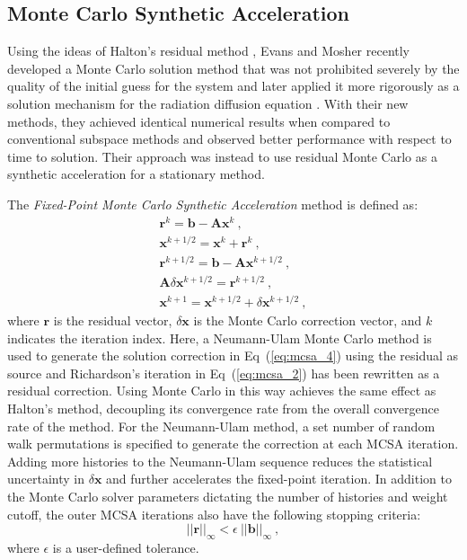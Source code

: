 \documentclass{snamc2013}
\begin{document}
\subsection{Monte Carlo Synthetic Acceleration}
Using the ideas of Halton's residual method
\cite{halton_sequential_1994}, Evans and Mosher recently developed a
Monte Carlo solution method that was not prohibited severely by the
quality of the initial guess for the system \cite{evans_monte_2009}
and later applied it more rigorously as a solution mechanism for the
radiation diffusion equation \cite{evans_monte_2012}. With their new
methods, they achieved identical numerical results when compared to
conventional subspace methods and observed better performance with
respect to time to solution. Their approach was instead to use
residual Monte Carlo as a synthetic acceleration for a stationary
method.

The \textit{Fixed-Point Monte Carlo Synthetic Acceleration} method is
defined as:
\begin{subequations}
  \begin{gather}
    \label{eq:mcsa_1}
    \mathbf{r}^{k} = \mathbf{b} - \mathbf{A}\mathbf{x}^{k}\:,\\
    \label{eq:mcsa_2}
    \mathbf{x}^{k+1/2} = \mathbf{x}^k + \mathbf{r}^k\:,\\
    \label{eq:mcsa_3}
    \mathbf{r}^{k+1/2} = \mathbf{b} - \mathbf{A}\mathbf{x}^{k+1/2}\:,\\
    \label{eq:mcsa_4}
    \mathbf{A}\delta\mathbf{x}^{k+1/2} = \mathbf{r}^{k+1/2}\:,\\
    \label{eq:mcsa_5}
    \mathbf{x}^{k+1} = \mathbf{x}^{k+1/2} + \delta \mathbf{x}^{k+1/2}\:,
  \end{gather}
  \label{eq:mcsa}
\end{subequations}
where $\mathbf{r}$ is the residual vector, $\delta\mathbf{x}$ is the
Monte Carlo correction vector, and $k$ indicates the iteration
index. Here, a Neumann-Ulam Monte Carlo method is used to generate the
solution correction in Eq~(\ref{eq:mcsa_4}) using the residual as
source and Richardson's iteration in Eq~(\ref{eq:mcsa_2}) has been
rewritten as a residual correction. Using Monte Carlo in this way
achieves the same effect as Halton's method, decoupling its
convergence rate from the overall convergence rate of the method. For
the Neumann-Ulam method, a set number of random walk permutations is
specified to generate the correction at each MCSA iteration. Adding
more histories to the Neumann-Ulam sequence reduces the statistical
uncertainty in $\delta\mathbf{x}$ and further accelerates the
fixed-point iteration. In addition to the Monte Carlo solver
parameters dictating the number of histories and weight cutoff, the
outer MCSA iterations also have the following stopping criteria:
\begin{equation}
  ||\mathbf{r}||_\infty < \epsilon \ ||\mathbf{b}||_\infty\:,
  \label{eq:mcsa_stopping_criteria}
\end{equation}
where $\epsilon$ is a user-defined tolerance.
\end{document}

